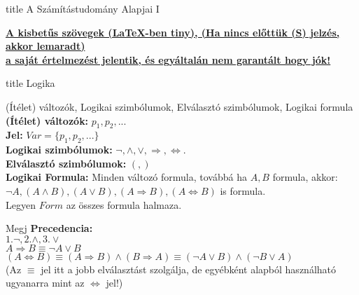 \documentclass{beamer}
\begin{document}
\begin{frame}[plain]
\begin{beamercolorbox}[center]{title}
    {\Huge A Számítástudomány Alapjai I}
    \bigskip
\end{beamercolorbox}
\end{frame}

\begin{frame}
\begin{block}{}
\underline{\textbf{A kisbetűs szövegek (LaTeX-ben tiny), (Ha nincs előttük (S) jelzés, akkor lemaradt)}}\\
\underline{\textbf{a saját értelmezést jelentik, és egyáltalán nem garantált hogy jók!}}
\end{block}
\end{frame}


\begin{frame}[plain]
\begin{beamercolorbox}[center]{title}
    {\Huge Logika}
    \medskip
\end{beamercolorbox}
\end{frame}

\begin{frame}

\begin{block}{(Ítélet) változók, Logikai szimbólumok, Elválasztó szimbólumok, Logikai formula}
\bigskip
\textbf{(Ítélet) változók:} $p_1, p_2, ...$\\
\hspace{1ex} \textbf{Jel: } $Var = \{p_1, p_2, ...\}$\\
\bigskip
\textbf{Logikai szimbólumok:} ${\neg}, {\land}, {\lor}, {\Rightarrow}, {\iff}.$\\
\bigskip
\textbf{Elválasztó szimbólumok:} $(, )$\\
\bigskip
\textbf{Logikai Formula:} Minden változó formula, továbbá ha $A, B$ formula, akkor:\\
\textbf{${\neg}A, (A \land B), (A \lor B), (A \Rightarrow B), (A \iff B)$} is formula.\\
\bigskip
Legyen $Form$ az összes formula halmaza.

\end{block}

\begin{block}{Megj}
\textbf{Precedencia:}\\ 
\bigskip
$1. {\neg}, 2. {\land}, 3. {\lor}$\\
\bigskip
$A \Rightarrow B \equiv {\neg}A \lor B$\\
$(A \iff B) \equiv (A \Rightarrow B) \land (B \Rightarrow A) \equiv ({\neg}A \lor B) \land ({\neg}B \lor A)$\\
\bigskip
(Az $\equiv$ jel itt a jobb elválasztást szolgálja, de egyébként alapból használható ugyanarra mint az $\iff$ jel!)

\end{block}

\end{frame}
\end{document}
